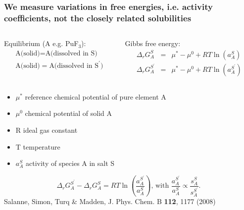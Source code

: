 \documentclass{beamer}
\begin{document}
\begin{frame}
    \frametitle{We measure variations in free energies, i.e. activity coefficients, not the closely related solubilities}
    \begin{columns}
        \begin{column}{6cm}
            Equilibrium (A e.g. PuF$_3$):
            \begin{eqnarray}
                \text{A(solid)} = \text{A(dissolved in S)}  \\
                \text{A(solid)} = \text{A(dissolved in S}^\prime)
            \end{eqnarray}
        \end{column}
        \begin{column}{6cm}
            Gibbs free energy:
            \begin{eqnarray}
                \Delta_r G^S_A &=& \mu^* - \mu^0 + RT\ln(a_A^S) \nonumber \\
                \Delta_r G^{S^{\prime}}_A &=& \mu^* - \mu^0 + RT\ln(a_{A}^{S^\prime}) \nonumber
            \end{eqnarray}
        \end{column}
    \end{columns}
    \begin{itemize}
        \item $\mu^*$ reference chemical potential of pure element A
        \item $\mu^0$ chemical potential of solid A
        \item R ideal gas constant
        \item T temperature
        \item $a_A^S$ activity of species A in salt S
    \end{itemize}
    \begin{equation}
        \Delta_r G^{S^\prime}_A - \Delta_r G^S_A = RT\ln\left( \frac{a_{A}^{S^\prime}}{a_A^S}  \right)\text{, with }\frac{a_{A}^{S^\prime}}{a_A^S} \propto \frac{s_A^S}{s_{A}^{S^\prime}}.\nonumber
    \end{equation}
    \scriptsize{Salanne, Simon, Turq \& Madden, J. Phys. Chem. B \textbf{112}, 1177 (2008)}
\end{frame}
\end{document}
